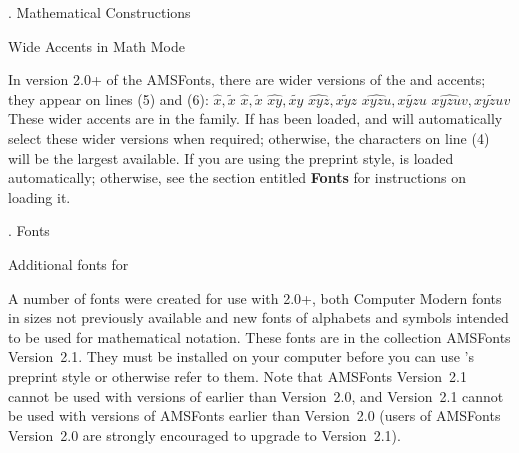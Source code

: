 . Mathematical Constructions
\endhead

\subhead Wide Accents in Math Mode \endsubhead

In version 2.0+ of the AMSFonts,
there are wider versions of the  and 
accents; they appear on lines (5) and (6):
\beginexample{}
 $\hat x, \tilde x$
 $\widehat x, \widetilde x$
  $\widehat{xy}, \widetilde{xy}$
  $\widehat{xyz}, \widetilde{xyz}$
  $\widehat{xyzu}, \widetilde{xyzu}$
  $\widehat{xyzuv}, \widetilde{xyzuv}$
\endexample
\noindent
These wider accents are in the  family.  If 
has been loaded,  and  will automatically
select these wider versions when required; otherwise, the characters
on line (4) will be the largest available.  If you are using the
preprint style,  is loaded automatically; otherwise,
see the section entitled {\bf Fonts} for instructions on loading it.



. Fonts\endhead

\subhead Additional fonts for \AmSTeX{}\endsubhead

A number of fonts were created for use with \AmSTeX{} 2.0+, both
Computer Modern fonts in sizes not previously available and new fonts
of alphabets and symbols intended to be used for mathematical notation.
These fonts are in the collection AMSFonts Version~2.1.  They must be
installed on your computer before you can use \AmSTeX{}'s preprint style
or otherwise refer to them.
Note that AMSFonts Version~2.1 cannot be used with versions of \AmSTeX{}
earlier than Version~2.0, and \AmSTeX{} Version~2.1 cannot be used with
versions of AMSFonts earlier than Version~2.0
(users of AMSFonts Version~2.0 are strongly encouraged to upgrade to
Version~2.1).

